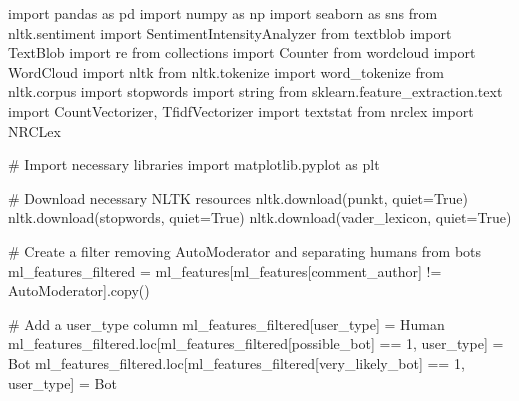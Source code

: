 \documentclass[
  12pt,
  letterpaper,
  DIV=11,
  numbers=noendperiod]{scrartcl}
\newenvironment{Shaded}{\begin{snugshade}}{\end{snugshade}}
\newcommand{\CommentTok}[1]{\textcolor[rgb]{0.37,0.37,0.37}{#1}}
\newcommand{\DecValTok}[1]{\textcolor[rgb]{0.68,0.00,0.00}{#1}}
\newcommand{\ImportTok}[1]{\textcolor[rgb]{0.00,0.46,0.62}{#1}}
\newcommand{\NormalTok}[1]{\textcolor[rgb]{0.00,0.23,0.31}{#1}}
\newcommand{\OperatorTok}[1]{\textcolor[rgb]{0.37,0.37,0.37}{#1}}
\newcommand{\StringTok}[1]{\textcolor[rgb]{0.13,0.47,0.30}{#1}}
\newcommand{\VariableTok}[1]{\textcolor[rgb]{0.07,0.07,0.07}{#1}}
\begin{document}
\begin{Shaded}
\begin{Highlighting}[]
\ImportTok{import}\NormalTok{ pandas }\ImportTok{as}\NormalTok{ pd}
\ImportTok{import}\NormalTok{ numpy }\ImportTok{as}\NormalTok{ np}
\ImportTok{import}\NormalTok{ seaborn }\ImportTok{as}\NormalTok{ sns}
\ImportTok{from}\NormalTok{ nltk.sentiment }\ImportTok{import}\NormalTok{ SentimentIntensityAnalyzer}
\ImportTok{from}\NormalTok{ textblob }\ImportTok{import}\NormalTok{ TextBlob}
\ImportTok{import}\NormalTok{ re}
\ImportTok{from}\NormalTok{ collections }\ImportTok{import}\NormalTok{ Counter}
\ImportTok{from}\NormalTok{ wordcloud }\ImportTok{import}\NormalTok{ WordCloud}
\ImportTok{import}\NormalTok{ nltk}
\ImportTok{from}\NormalTok{ nltk.tokenize }\ImportTok{import}\NormalTok{ word\_tokenize}
\ImportTok{from}\NormalTok{ nltk.corpus }\ImportTok{import}\NormalTok{ stopwords}
\ImportTok{import}\NormalTok{ string}
\ImportTok{from}\NormalTok{ sklearn.feature\_extraction.text }\ImportTok{import}\NormalTok{ CountVectorizer, TfidfVectorizer}
\ImportTok{import}\NormalTok{ textstat}
\ImportTok{from}\NormalTok{ nrclex }\ImportTok{import}\NormalTok{ NRCLex}

\CommentTok{\# Import necessary libraries}
\ImportTok{import}\NormalTok{ matplotlib.pyplot }\ImportTok{as}\NormalTok{ plt}

\CommentTok{\# Download necessary NLTK resources}
\NormalTok{nltk.download(}\StringTok{\textquotesingle{}punkt\textquotesingle{}}\NormalTok{, quiet}\OperatorTok{=}\VariableTok{True}\NormalTok{)}
\NormalTok{nltk.download(}\StringTok{\textquotesingle{}stopwords\textquotesingle{}}\NormalTok{, quiet}\OperatorTok{=}\VariableTok{True}\NormalTok{)}
\NormalTok{nltk.download(}\StringTok{\textquotesingle{}vader\_lexicon\textquotesingle{}}\NormalTok{, quiet}\OperatorTok{=}\VariableTok{True}\NormalTok{)}

\CommentTok{\# Create a filter removing AutoModerator and separating humans from bots}
\NormalTok{ml\_features\_filtered }\OperatorTok{=}\NormalTok{ ml\_features[ml\_features[}\StringTok{\textquotesingle{}comment\_author\textquotesingle{}}\NormalTok{] }\OperatorTok{!=} \StringTok{\textquotesingle{}AutoModerator\textquotesingle{}}\NormalTok{].copy()}

\CommentTok{\# Add a \textquotesingle{}user\_type\textquotesingle{} column}
\NormalTok{ml\_features\_filtered[}\StringTok{\textquotesingle{}user\_type\textquotesingle{}}\NormalTok{] }\OperatorTok{=} \StringTok{\textquotesingle{}Human\textquotesingle{}}
\NormalTok{ml\_features\_filtered.loc[ml\_features\_filtered[}\StringTok{\textquotesingle{}possible\_bot\textquotesingle{}}\NormalTok{] }\OperatorTok{==} \DecValTok{1}\NormalTok{, }\StringTok{\textquotesingle{}user\_type\textquotesingle{}}\NormalTok{] }\OperatorTok{=} \StringTok{\textquotesingle{}Bot\textquotesingle{}}
\NormalTok{ml\_features\_filtered.loc[ml\_features\_filtered[}\StringTok{\textquotesingle{}very\_likely\_bot\textquotesingle{}}\NormalTok{] }\OperatorTok{==} \DecValTok{1}\NormalTok{, }\StringTok{\textquotesingle{}user\_type\textquotesingle{}}\NormalTok{] }\OperatorTok{=} \StringTok{\textquotesingle{}Bot\textquotesingle{}}


\end{Highlighting}
\end{Shaded}
\end{document}

